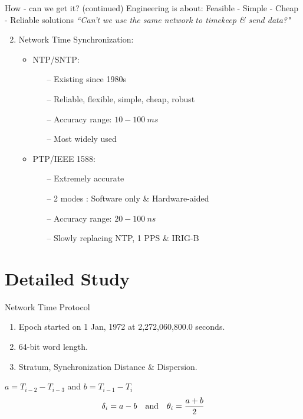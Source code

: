 \documentclass{beamer}
\begin{document}
   \begin{frame}{How - can we get it? \tiny{(continued)}}
   	Engineering is about: Feasible - Simple - Cheap - Reliable solutions
   	\small \textit{``Can't we use the same network to timekeep \& send data?"}\\

   	\begin{enumerate}
   		\setcounter{enumi}{1}
   		\item   Network Time Synchronization:
   		\begin{itemize}
   			\item NTP/SNTP:
   			\begin{itemize}
   				\item[--] Existing since 1980s
   				\item[--] Reliable, flexible, simple, cheap, robust 
   				\item[--] Accuracy range: $10 - 100~ms$
   				\item[--] Most widely used
   			\end{itemize}
   			\item PTP/IEEE 1588:
   			\begin{itemize}
   				\item [--] Extremely accurate
   				\item [--] 2 modes : Software only \& Hardware-aided
   				\item [--] Accuracy range: $20 - 100~ns$
   				\item [--] Slowly replacing NTP, 1 PPS \& IRIG-B
   			\end{itemize}
   		\end{itemize}	
   	\end{enumerate}
   \end{frame}
   \section{Detailed Study}
      \begin{frame}{Network Time Protocol}
      	\begin{enumerate}
      		\item Epoch started on 1 Jan, 1972 at  2,272,060,800.0 seconds.
      		\item 64-bit word length.
      		\item Stratum, Synchronization Distance \& Dispersion.
      	\end{enumerate}
     \begin{figure}[!t]
     	\centering 
     \end{figure}
    \centering $a = T_{i-2}- T_{i-3}$ \quad and \quad $b =T_{i-1}- T_{i}$    
	\begin{displaymath}
	\centering
	\delta_{i} = a - b \quad \textrm{and} \quad \theta_{i} = \frac{a+b}{2} 
	\end{displaymath}      	 
      \end{frame}
\end{document}
